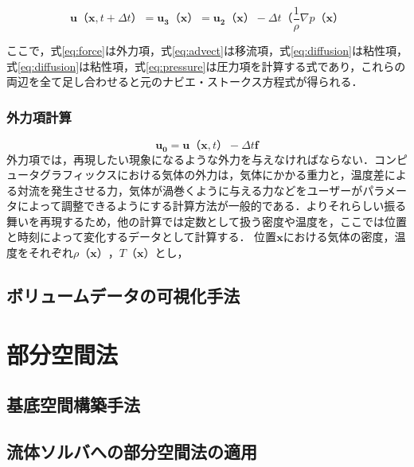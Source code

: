 \documentclass[a4j,12pt]{jreport}
\begin{document}
\begin{equation}\label{eq:pressure}
	\bm{u} （\bm{x},t + \varDelta t）= \bm{u_3（\bm{x}）}  =  \bm{u_2（\bm{x}）} - \varDelta t （\frac{1}{\rho}\nabla p （\bm{x}）
\end{equation} 

ここで，式\ref{eq:force}は外力項，式\ref{eq:advect}は移流項，式\ref{eq:diffusion}は粘性項，式\ref{eq:diffusion}は粘性項，式\ref{eq:pressure}は圧力項を計算する式であり，これらの両辺を全て足し合わせると元のナビエ・ストークス方程式が得られる．
\subsection{外力項計算}
\begin{equation}
	\bm{u_0} =  \bm{u} （\bm{x},t）  - \varDelta t \bm{f} 
\end{equation} 
外力項では，再現したい現象になるような外力を与えなければならない．コンピュータグラフィックスにおける気体の外力は，気体にかかる重力と，温度差による対流を発生させる力，気体が渦巻くように与える力などをユーザーがパラメータによって調整できるようにする計算方法が一般的である．よりそれらしい振る舞いを再現するため，他の計算では定数として扱う密度や温度を，ここでは位置と時刻によって変化するデータとして計算する．
位置$\bm{x}$における気体の密度，温度をそれぞれ$\rho（\bm{x}）$，$T（\bm{x}）$とし，
\section{ボリュームデータの可視化手法}

\chapter{部分空間法} \label{chapter:3}
	\section{基底空間構築手法}
	\section{流体ソルバへの部分空間法の適用}
\end{document}
